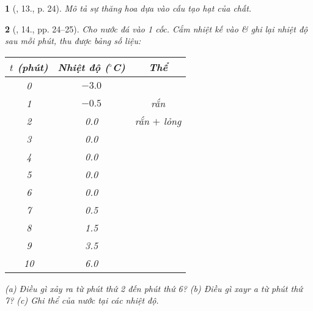\documentclass{article}
\newtheorem{baitoan}{}
\begin{document}
\begin{baitoan}[\cite{ncpt_KHTN_6_tap_1}, 13., p. 24]
	Mô tả sự thăng hoa dựa vào cấu tạo hạt của chất.
\end{baitoan}

\begin{baitoan}[\cite{ncpt_KHTN_6_tap_1}, 14., pp. 24--25]
	Cho nước đá vào 1 cốc. Cắm nhiệt kế vào \& ghi lại nhiệt độ sau mỗi phút, thu được bảng số liệu:
	\begin{table}[H]
		\centering
		\begin{tabular}{|c|c|c|}
			\hline
			$t$ (phút) & Nhiệt độ (${}^\circ$C) & Thể \\
			\hline
			0 & $-3.0$ &  \\
			\hline
			1 & $-0.5$ & rắn \\
			\hline
			2 & 0.0 & rắn $+$ lỏng \\
			\hline
			3 & 0.0 &  \\
			\hline
			4 & 0.0 &  \\
			\hline
			5 & 0.0 &  \\
			\hline
			6 & 0.0 &  \\
			\hline
			7 & 0.5 &  \\
			\hline
			8 & 1.5 &  \\
			\hline
			9 & 3.5 &  \\
			\hline
			10 & 6.0 &  \\
			\hline
		\end{tabular}
	\end{table}
	\noindent(a) Điều gì xảy ra từ phút thứ 2 đến phút thứ 6? (b) Điều gì xayr a từ phút thứ 7? (c) Ghi thể của nước tại các nhiệt độ.
\end{baitoan}
\end{document}
